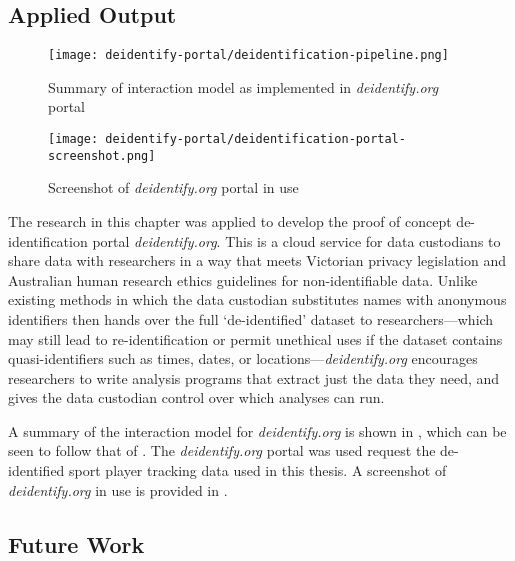 \subsection*{Applied Output}

\begin{figure}[htp]
  \centering
  \texttt{[image: deidentify-portal/deidentification-pipeline.png]}
  \caption{Summary of interaction model as implemented in \textit{deidentify.org} portal}
  \label{fig:deident-pipeline-summary}
\end{figure}

\begin{figure}[htp]
  \centering
  \texttt{[image: deidentify-portal/deidentification-portal-screenshot.png]}
  \caption{Screenshot of \textit{deidentify.org} portal in use}
  \label{fig:deident-portal-screenshot}
\end{figure}

The research in this chapter was applied to develop the proof of concept de-identification portal \textit{deidentify.org}. This is a cloud service for data custodians to share data with researchers in a way that meets Victorian privacy legislation and Australian human research ethics guidelines for non-identifiable data. Unlike existing methods in which the data custodian substitutes names with anonymous identifiers then hands over the full `de-identified' dataset to researchers---which may still lead to re-identification or permit unethical uses if the dataset contains quasi-identifiers such as times, dates, or locations---\textit{deidentify.org} encourages researchers to write analysis programs that extract just the data they need, and gives the data custodian control over which analyses can run.

A summary of the interaction model for \textit{deidentify.org} is shown in , which can be seen to follow that of . The \textit{deidentify.org} portal was used request the de-identified sport player tracking data used in this thesis. A screenshot of \textit{deidentify.org} in use is provided in .

\subsection*{Future Work}

